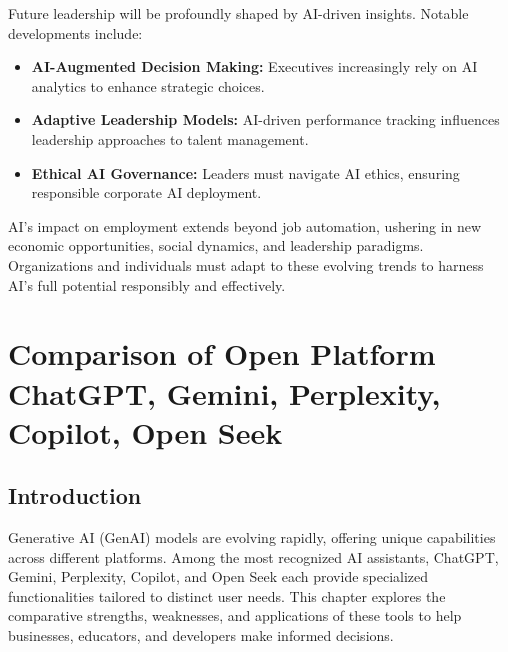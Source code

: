 \documentclass[a4paper,headinclude=on,footinclude=on,12pt,oneside]{scrbook}
\begin{document}

Future leadership will be profoundly shaped by AI-driven insights. Notable developments include:
\begin{itemize}
	\item \textbf{AI-Augmented Decision Making:} Executives increasingly rely on AI analytics to enhance strategic choices.
	\item \textbf{Adaptive Leadership Models:} AI-driven performance tracking influences leadership approaches to talent management.
	\item \textbf{Ethical AI Governance:} Leaders must navigate AI ethics, ensuring responsible corporate AI deployment.
\end{itemize}


AI’s impact on employment extends beyond job automation, ushering in new economic opportunities, social dynamics, and leadership paradigms. Organizations and individuals must adapt to these evolving trends to harness AI’s full potential responsibly and effectively.




\chapter{Comparison of Open Platform ChatGPT, Gemini, Perplexity, Copilot, Open Seek}


\section{Introduction}

Generative AI (GenAI) models are evolving rapidly, offering unique capabilities across different platforms. Among the most recognized AI assistants, ChatGPT, Gemini, Perplexity, Copilot, and Open Seek each provide specialized functionalities tailored to distinct user needs. This chapter explores the comparative strengths, weaknesses, and applications of these tools to help businesses, educators, and developers make informed decisions.
\end{document}
